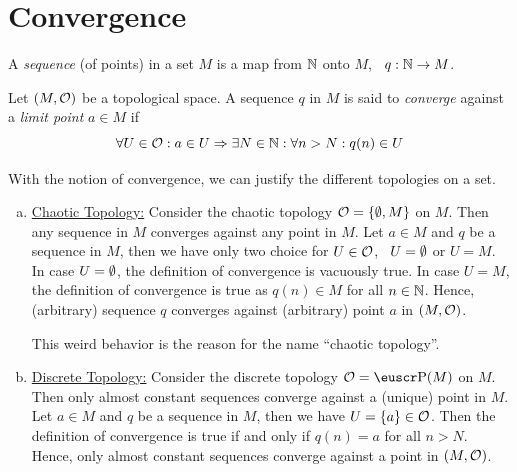 \section{Convergence}

\begin{definition}[Sequence]
	A \emph{sequence} (of points) in a set \(M\) is a map from \(\mathbb N\) onto \(M\), \ie\ \(q: \mathbb N \to M\).
\end{definition}

\begin{definition}
	Let \((M, \mathcal{O})\) be a topological space. A sequence \(q\) in \(M\) is said to \emph{converge} against a \emph{limit point} \(a \in M\) if
	\begin{equation}
		\forall U \in \mathcal{O}: a \in U \Rightarrow \exists N \in \mathbb N: \forall n > N: q(n) \in U \label{eq:convergence}
	\end{equation}
\end{definition}

\begin{example}
	With the notion of convergence, we can justify the different topologies on a set.
	\begin{enumerate}[(a)]
		\item \uline{Chaotic Topology:} Consider the chaotic topology \(\mathcal{O} = \qty{\emptyset, M}\) on \(M\). Then any sequence in \(M\) converges against any point in \(M\). Let \(a \in M\) and \(q\) be a sequence in \(M\), then we have only two choice for \(U \in \mathcal{O}\), \ie\ \(U = \emptyset\) or \(U = M\). In case \(U = \emptyset\), the definition of convergence is vacuously true. In case \(U = M\), the definition of convergence is true as \(q(n) \in M\) for all \(n \in \mathbb N\). Hence, (arbitrary) sequence \(q\) converges against (arbitrary) point \(a\) in \((M, \mathcal{O})\).

		      This weird behavior is the reason for the name ``chaotic topology''.

		\item \uline{Discrete Topology:} Consider the discrete topology \(\CO = \powerset(M)\) on \(M\). Then only almost constant sequences converge against a (unique) point in \(M\). Let \(a \in M\) and \(q\) be a sequence in \(M\), then we have \(U = \qty{a} \in \mathcal{O}\). Then the definition of convergence is true if and only if \(q(n) = a\) for all \(n > N\). Hence, only almost constant sequences converge against a point in \((M, \mathcal{O})\).
	\end{enumerate}
\end{example}

